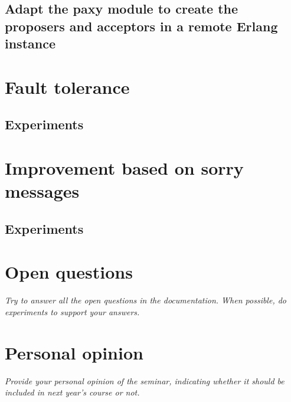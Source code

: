 \documentclass[a4paper, 10pt]{article}
\begin{document}
\subsection{Adapt the paxy module to create the proposers and acceptors in a remote Erlang instance}



\section{Fault tolerance}

\subsection{Experiments}

\section{Improvement based on sorry messages}

\subsection{Experiments}

\section{Open questions}

\textit{Try to answer all the open questions in the documentation. When possible, do experiments to support your answers.}

\section{Personal opinion}

\textit{Provide your personal opinion of the seminar, indicating whether it should be included in next year's course or not.}
\end{document}
